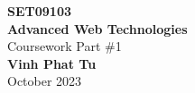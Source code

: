 \begin{titlepage}
    \pagebreak
    \hspace{0pt}
    \vfill
    \begin{center}
    {\fontsize{30}{48}\selectfont \bfseries SET09103}
        \\\vspace{10pt}
        {\fontsize{30}{48}\selectfont \bfseries Advanced Web Technologies}
        \\\vspace{20pt}
        {\LARGE Coursework Part \#1} \\
        \vspace{20pt}
        \textbf{Vinh Phat Tu }
        \vspace{8pt}
        \\ October 2023
    \end{center}
    \vfill
    \hspace{0pt}
    \pagebreak
\end{titlepage}